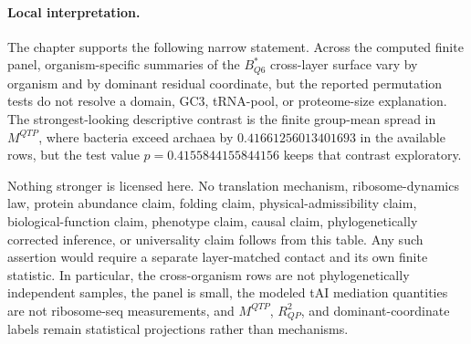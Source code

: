 \paragraph{Local interpretation.}
The chapter supports the following narrow statement. Across the computed finite panel, organism-specific summaries of the $B^*_{Q6}$ cross-layer surface vary by organism and by dominant residual coordinate, but the reported permutation tests do not resolve a domain, GC3, tRNA-pool, or proteome-size explanation. The strongest-looking descriptive contrast is the finite group-mean spread in $M^{QTP}$, where bacteria exceed archaea by $0.41661256013401693$ in the available rows, but the test value $p=0.4155844155844156$ keeps that contrast exploratory.

Nothing stronger is licensed here. No translation mechanism, ribosome-dynamics law, protein abundance claim, folding claim, physical-admissibility claim, biological-function claim, phenotype claim, causal claim, phylogenetically corrected inference, or universality claim follows from this table. Any such assertion would require a separate layer-matched contact and its own finite statistic. In particular, the cross-organism rows are not phylogenetically independent samples, the panel is small, the modeled tAI mediation quantities are not ribosome-seq measurements, and $M^{QTP}$, $R^2_{QP}$, and dominant-coordinate labels remain statistical projections rather than mechanisms.